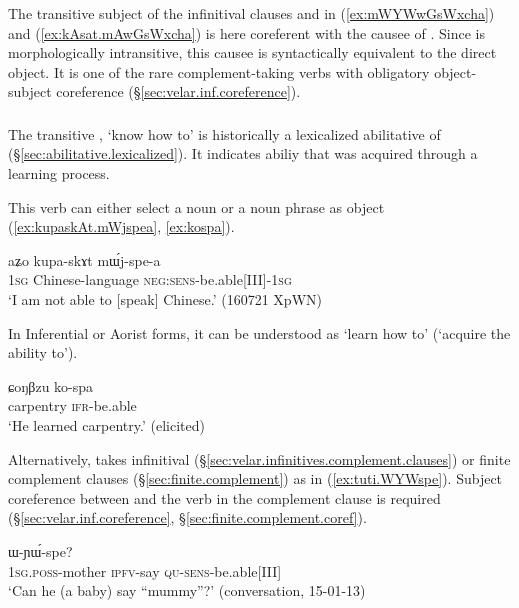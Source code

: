 The transitive subject of the infinitival clauses  and  in (\ref{ex:mWYWwGsWxcha}) and (\ref{ex:kAsat.mAwGsWxcha}) is here coreferent with the causee of . Since  is morphologically intransitive, this causee is syntactically equivalent to the direct object. It is one of the rare com\-ple\-ment-taking verbs with obligatory object-subject coreference (§\ref{sec:velar.inf.coreference}).

 \subsubsection{}  \label{sec:spa.verb}
The transitive , `know how to' is historically a lexicalized abilitative of  (§\ref{sec:abilitative.lexicalized}). It indicates abiliy that was acquired through a learning process.

This verb can either select a noun or a noun phrase as object (\ref{ex:kupaskAt.mWjspea}, \ref{ex:kospa}). 


\begin{exe}
\ex \label{ex:kupaskAt.mWjspea}
\gll aʑo kupa-skɤt mɯ́j-spe-a \\
\textsc{1sg} Chinese-language \textsc{neg}:\textsc{sens}-be.able[III]-\textsc{1sg} \\
\glt `I am not able to [speak] Chinese.' (160721 XpWN)
\end{exe}

In Inferential or Aorist forms, it can be understood as `learn how to' (`acquire the ability to').

\begin{exe}
\ex \label{ex:kospa}
\gll ɕoŋβzu ko-spa \\
carpentry \textsc{ifr}-be.able \\
\glt `He learned carpentry.' (elicited)
\end{exe}

Alternatively,  takes infinitival (§\ref{sec:velar.infinitives.complement.clauses}) or finite complement clauses (§\ref{sec:finite.complement}) as in (\ref{ex:tuti.WYWspe}). Subject coreference between  and the verb in the complement clause is required  (§\ref{sec:velar.inf.coreference},  §\ref{sec:finite.complement.coref}).

\begin{exe}
\ex \label{ex:tuti.WYWspe}
 \gll [``a-mu" tu-ti] ɯ-ɲɯ́-spe? \\
 \textsc{1sg}.\textsc{poss}-mother \textsc{ipfv}-say \textsc{qu}-\textsc{sens}-be.able[III] \\
 \glt `Can he (a baby) say ``mummy''?' (conversation, 15-01-13)
  \end{exe}
  

